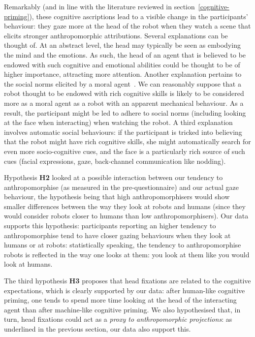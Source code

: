 \documentclass[lettersize, noapacite, twoside, HRI]{apa_HRI}
\newcommand{\h}[1]{\textbf{H#1}\xspace}
\begin{document}
Remarkably (and in line with the literature reviewed in
section~\ref{cognitive-priming}), these cognitive ascriptions lead to a visible
change in the participants' behaviour: they gaze more at the head of the robot
when they watch a scene that elicits stronger anthropomorphic attributions.
Several explanations can be thought of. At an abstract level, the head may
typically be seen as embodying the mind and the emotions. As such, the head of
an agent that is believed to be endowed with such cognitive and emotional
abilities could be thought to be of higher importance, attracting more
attention. Another explanation pertains to the social norms elicited by a moral
agent~\citep{malle2014moral}. We can reasonably suppose that a robot thought to
be endowed with rich cognitive skills is likely to be considered more as a moral
agent as a robot with an apparent mechanical behaviour. As a result, the
participant might be led to adhere to social norms (including looking at the
face when interacting) when watching the robot. A third explanation involves
automatic social behaviours: if the participant is tricked into believing that
the robot might have rich cognitive skills, she might automatically search for
even more socio-cognitive cues, and the face is a particularly rich source of
such cues (facial expressions, gaze, back-channel communication like nodding).

Hypothesis \h{2} looked at a possible interaction between our tendency to
anthropomorphise (as measured in the pre-questionnaire) and our actual gaze
behaviour, the hypothesis being that high anthropomorphisers would show smaller
differences between the way they look at robots and humans (since they would
consider robots closer to humans than low anthropomorphisers). Our data supports
this hypothesis: participants reporting an higher tendency to anthropomorphise
tend to have closer gazing behaviours when they look at humans or at robots:
statistically speaking, the tendency to anthropomorphise robots
is reflected in the way one looks at them: you look at them
like you would look at humans.

The third hypothesis \h{3} proposes that head fixations are related to the
cognitive expectations, which is clearly supported by our data: after human-like cognitive
priming, one tends to spend more time looking at the head of the interacting
agent than after machine-like cognitive priming. We also hypothesised that, in turn,
head fixations could act as a \emph{proxy to anthropomorphic projections}: as
underlined in the previous section, our data also support this.
\end{document}
